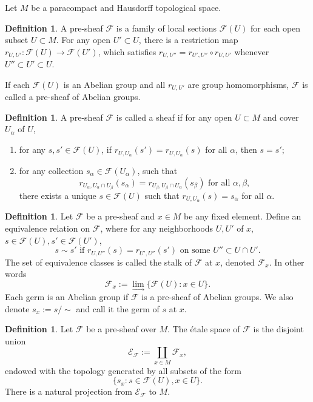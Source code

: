 \documentclass[a4paper]{amsart}
\newcommand{\maE}{\mathcal E}
\newcommand{\maF}{\mathcal F}
\newcommand\<{\langle}
\renewcommand\>{\rangle}
\theoremstyle{definition}
\newtheorem{dfn}[theorem]{Definition}
\theoremstyle{remark}
\begin{document}
Let $M$ be a paracompact and Hausdorff topological space.
\begin{dfn}
A pre-sheaf $\maF$ is a family of local sections $\maF (U )$ for each open subset $U \subset M$.
For any open $U' \subset U$, there is a restriction map $r_{U,U'} : \maF (U ) \to \maF (U')$,
which satisfies
$r _{U, U''} = r_{U', U''} \circ r_{U, U'}$
whenever $U'' \subset U' \subset U$.

If each $\maF (U)$ is an Abelian group and all $r_{U, U'}$ are group homomorphisms, $\maF$ is called a pre-sheaf of Abelian groups.
\end{dfn}

\begin{dfn}
A pre-sheaf $\maF$ is called a sheaf if for any open $U \subset M$ and cover
$ U _\alpha $ of $U$,
\begin{enumerate}
\item
for any $s, s' \in \maF (U)$, if $r_{U, U _\alpha} (s') = r_{U, U _\alpha} (s) $
for all $\alpha$, then $s = s'$;
\item
for any collection $s _\alpha \in \maF (U _\alpha )$, such that
$$ r _{U _\alpha , U_\alpha \cap U_\beta} (s _\alpha ) = r _{U_\beta , U_\beta \cap U_\alpha} (s _\beta )
\text { for all $\alpha, \beta$},$$
there exists a unique $s \in \maF (U )$ such that
$r _{U ,U _\alpha} (s) = s _\alpha$ for all $\alpha$.
\end{enumerate}
\end{dfn}

\begin{dfn}
Let $\maF$ be a pre-sheaf and $x \in M$ be any fixed element.
Define an equivalence relation on $\maF$, where for any neighborhoods $U, U'$ of $x$,
$s \in \maF (U), s' \in \maF (U')$,
$$ s \sim s' \text{ if } r _{U ,U''} (s) = r _{U', U''}(s') \text{ on some } U'' \subset U \cap U'.$$
The set of equivalence classes is called the stalk of $\maF$ at $x$, denoted $\maF _x$.
In other words
$$\maF _x := \lim _\to \{ \maF (U) : x \in U \}.$$
Each germ is an Abelian group if $\maF$ is a pre-sheaf of Abelian groups.
We also denote $s _x := s / \sim$ and call it the germ of $s$ at $x$.
\end{dfn}

\begin{dfn}
Let $\maF$ be a pre-sheaf over $M$. The \'etale space of $\maF$ is the disjoint union
$$\maE _\maF := \coprod _{x \in M} \maF _x,$$
endowed with the topology generated by all subsets of the form
$$\{ s_x : s \in \maF (U), x \in U \}.$$
There is a natural projection from $\maE _\maF$ to $M$.
\end{dfn}
\end{document}
